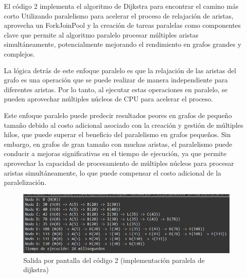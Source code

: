 El código 2 implementa el algoritmo de Dijkstra para encontrar el camino más corto Utilizando paralelismo para acelerar el proceso de relajación de aristas, aprovecha un ForkJoinPool y la creación de tareas paralelas como componentes clave que permite al algoritmo paralelo procesar múltiples aristas simultáneamente, potencialmente mejorando el rendimiento en grafos grandes y complejos. 

La lógica detrás de este enfoque paralelo es que la relajación de las aristas del grafo es una operación que se puede realizar de manera independiente para diferentes aristas. Por lo tanto, al ejecutar estas operaciones en paralelo, se pueden aprovechar múltiples núcleos de CPU para acelerar el proceso.

Este enfoque paralelo puede predecir resultados peores en grafos de pequeño tamaño debido al costo adicional asociado con la creación y gestión de múltiples hilos, que puede superar el beneficio del paralelismo en grafos pequeños. Sin embargo, en grafos de gran tamaño con muchas aristas, el paralelismo puede conducir a mejoras significativas en el tiempo de ejecución, ya que permite aprovechar la capacidad de procesamiento de múltiples núcleos para procesar aristas simultáneamente, lo que puede compensar el costo adicional de la paralelización.

\begin{figure}[h]
	\centering \includegraphics[width=1\linewidth]{img/Salida_codigo_paralelo_8.jpg}
	\caption{Salida por pantalla del código 2 (implementación paralela de dijkstra)}
	\label{fig:etiqueta1}
\end{figure}


